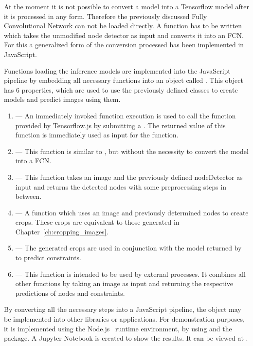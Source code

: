 At the moment it is not possible to convert a model into a Tensorflow model after it is processed in any form.
Therefore the previously discussed Fully Convolutional Network can not be loaded directly.
A function has to be written which takes the unmodified node detector as input and converts it into an FCN.\@
For this a generalized form of the conversion processed has been implemented in JavaScript.

Functions loading the inference models are implemented into the JavaScript pipeline by embedding all necessary functions into an object called .
This object has 6 properties, which are used to use the previously defined classes to create models and predict images using them.

\begin{enumerate}
    \item {} --- An immediately invoked function execution is used to call the  function provided by Tensorflow.js by submitting a .
    The returned value of this function is immediately used as input for the  function.
    \item {} --- This function is similar to , but without the necessity to convert the model into a FCN.\@
    \item {} --- This function takes an image and the previously defined nodeDetector as input and returns the detected nodes with some preprocessing steps in between.
    \item {} --- A function which uses an image and previously determined nodes to create crops. These crops are equivalent to those generated in Chapter~\ref{ch:cropping_images}.
    \item {} --- The generated crops are used in conjunction with the model returned by  to predict constraints.
    \item {} --- This function is intended to be used by external processes.
    It combines all other functions by taking an image as input and returning the respective predictions of nodes and constraints.
\end{enumerate}

By converting all the necessary steps into a JavaScript pipeline, the  object may be implemented into other libraries or applications.
For demonstration purposes, it is implemented using the Node.js~\cite{Joyent2021} runtime environment, by using  and the  package.
A Jupyter Notebook is created to show the results.
It can be viewed at .


